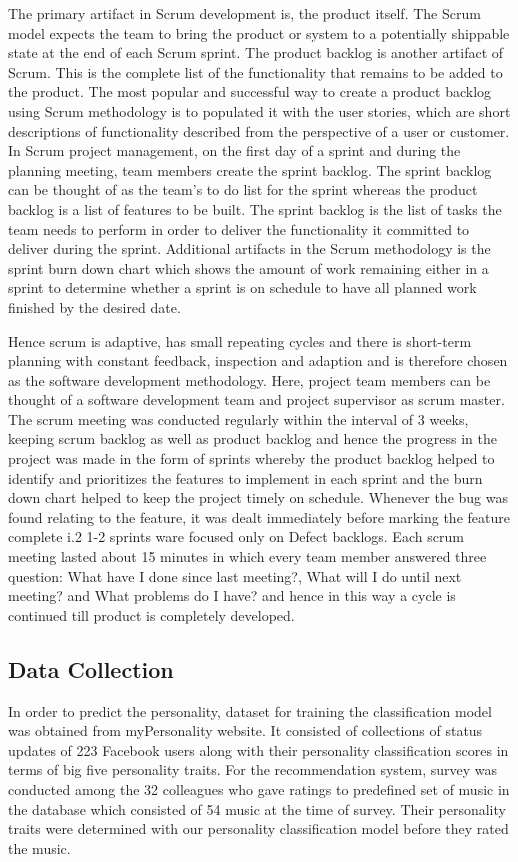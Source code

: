 The primary artifact in Scrum development is, the product itself. The Scrum model expects the team to bring the product or system to a potentially shippable state at the end of each Scrum sprint. The product backlog is another artifact of Scrum. This is the complete list of the functionality that remains to be added to the product. The most popular and successful way to create a product backlog using Scrum methodology is to populated it with the user stories, which are short descriptions of functionality described from the perspective of a user or customer. In Scrum project management, on the first day of a sprint and during the planning meeting, team members create the sprint backlog. The sprint backlog can be thought of as the team's to do list for the sprint whereas the product backlog is a list of features to be built. The sprint backlog is the list of tasks the team needs to perform in order to deliver the functionality it committed to deliver during the sprint. Additional artifacts in the Scrum methodology is the sprint burn down chart which shows the amount of work remaining either in a sprint to determine whether a sprint is on schedule to have all planned work finished by the desired date.

Hence scrum is adaptive, has small repeating cycles and there is short-term planning with constant feedback, inspection and adaption and is therefore chosen as the software development methodology. Here, project team members can be thought of a software development team and project supervisor as scrum master. The scrum meeting was conducted regularly within the interval of 3 weeks, keeping scrum backlog as well as product backlog and hence the progress in the project was made in the form of sprints whereby the product backlog helped to identify and prioritizes the features to implement in each sprint and the burn down chart helped to keep the project timely on schedule. Whenever the bug was found relating to the feature, it was dealt immediately before marking the feature complete i.2 1-2 sprints ware focused only on Defect backlogs. Each scrum meeting lasted about 15 minutes in which every team member answered three question: What have I done since last meeting?, What will I do until next meeting? and What problems do I have? and hence in this way a cycle is continued till product is completely developed.


\subsection{Data Collection}
In order to predict the personality, dataset for training the classification model was obtained from myPersonality website\cite{dataset}. It consisted of collections of status updates of 223 Facebook users along with their personality classification scores in terms of big five personality traits. For the recommendation system, survey was conducted among the 32 colleagues who gave ratings to predefined set of music in the database which consisted of 54 music at the time of survey. Their personality traits were determined with our personality classification model before they rated the music.
